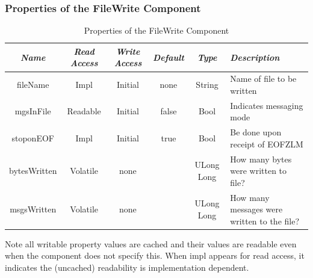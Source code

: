 \documentclass[10pt, a4paper, oneside]{article}
\renewcommand*{\arraystretch}{2.5}%
\renewcommand\_{\textunderscore\allowbreak} %
\begin{document}
\subsubsection{Properties of the File\_Write Component} 
\begin{table}[h]
\caption{Properties of the File\_Write Component}\renewcommand*{\arraystretch}{2.5}
\begin{tabular}[c]{|c|c|c|c|c|p{5cm}|}  
\hline \emph{Name} & \emph{Read Access} & \emph{Write Access} & \emph{Default} & \emph{Type} & \emph{Description}\\ 
\hline
 fileName & Impl & Initial &none & String &	Name of file to be written\\ 
\hline  
mgsInFile & Readable & Initial	& false& Bool & Indicates messaging mode\\ 
\hline 
stoponEOF &	Impl & Initial & true& Bool & Be done upon receipt of EOF\/ZLM\\ 
\hline 
bytesWritten & Volatile & none & {} & ULong Long & How many bytes were written to file?\\ 
\hline 
msgsWritten& Volatile & none	& {} & ULong Long & How many messages were written to the file?\\ 
\hline
\end{tabular}
\end{table}
Note all writable property values are cached and their values are readable even when the component does not specify this.  When impl appears for read access, it indicates the (uncached) readability is implementation dependent.
\end{document}
